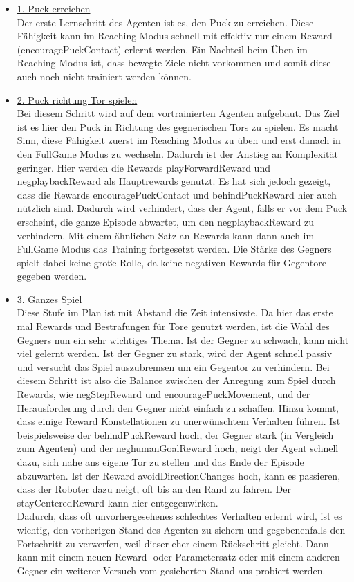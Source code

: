 \begin{itemize}
\item \underline{1. Puck erreichen} \\
Der erste Lernschritt des Agenten ist es, den Puck zu erreichen. Diese Fähigkeit kann im Reaching Modus schnell mit effektiv nur einem Reward (encouragePuckContact) erlernt werden. Ein Nachteil beim Üben im Reaching Modus ist, dass bewegte Ziele nicht vorkommen und somit diese auch noch nicht trainiert werden können.

\item \underline{2. Puck richtung Tor spielen} \\
Bei diesem Schritt wird auf dem vortrainierten Agenten aufgebaut. Das Ziel ist es hier den Puck in Richtung des gegnerischen Tors zu spielen. Es macht Sinn, diese Fähigkeit zuerst im Reaching Modus zu üben und erst danach in den FullGame Modus zu wechseln. Dadurch ist der Anstieg an Komplexität geringer. Hier werden die Rewards playForwardReward und negplaybackReward als Hauptrewards genutzt. Es hat sich jedoch gezeigt, dass die Rewards encouragePuckContact und behindPuckReward hier auch nützlich sind. Dadurch wird verhindert, dass der Agent, falls er vor dem Puck erscheint, die ganze Episode abwartet, um den negplaybackReward zu verhindern. Mit einem ähnlichen Satz an Rewards kann dann auch im FullGame Modus das Training fortgesetzt werden. Die Stärke des Gegners spielt dabei keine große Rolle, da keine negativen Rewards für Gegentore gegeben werden.

\item \underline{3. Ganzes Spiel} \\
Diese Stufe im Plan ist mit Abstand die Zeit intensivste. Da hier das erste mal Rewards und Bestrafungen für  Tore genutzt werden, ist die Wahl des Gegners nun ein sehr wichtiges Thema. Ist der Gegner zu schwach, kann nicht viel gelernt werden. Ist der Gegner zu stark, wird der Agent schnell passiv und versucht das Spiel auszubremsen um ein Gegentor zu verhindern. Bei diesem Schritt ist also die Balance zwischen der Anregung zum Spiel durch Rewards, wie negStepReward und encouragePuckMovement, und der Herausforderung durch den Gegner nicht einfach zu schaffen. Hinzu kommt, dass einige Reward Konstellationen zu unerwünschtem Verhalten führen. Ist beispielsweise der behindPuckReward hoch, der Gegner stark (in Vergleich zum Agenten) und der neghumanGoalReward hoch, neigt der Agent schnell dazu, sich nahe ans eigene Tor zu stellen und das Ende der Episode abzuwarten. Ist der Reward avoidDirectionChanges hoch, kann es passieren, dass der Roboter dazu neigt, oft bis an den Rand zu fahren. Der stayCenteredReward kann hier entgegenwirken. \\ 
Dadurch, dass oft unvorhergesehenes schlechtes Verhalten erlernt wird, ist es wichtig, den vorherigen Stand des Agenten zu sichern und gegebenenfalls den Fortschritt zu verwerfen, weil dieser eher einem Rückschritt gleicht. Dann kann mit einem neuen Reward- oder Parametersatz oder mit einem anderen Gegner ein weiterer Versuch vom gesicherten Stand aus probiert werden. 
\end{itemize}

